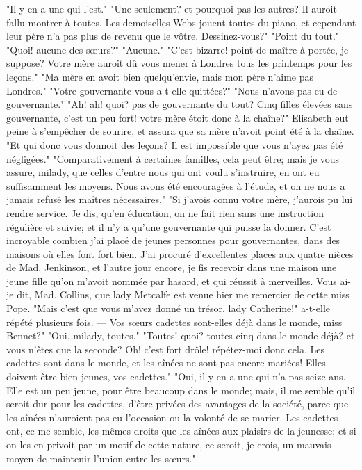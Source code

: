 "Il y en a une qui l'est."
"Une seulement? et pourquoi pas les autres? Il auroit fallu montrer à toutes. Les demoiselles Webs jouent toutes du piano, et cependant leur père n'a pas plus de revenu que le vôtre. Dessinez-vous?"
"Point du tout."
"Quoi! aucune des sœurs?"
"Aucune."
"C'est bizarre! point de maître à portée, je suppose? Votre mère auroit dû vous mener à Londres tous les printemps pour les leçons."
"Ma mère en avoit bien quelqu'envie, mais mon père n'aime pas Londres."
"Votre gouvernante vous a-t-elle quittées?"
"Nous n'avons pas eu de gouvernante."
"Ah! ah! quoi? pas de gouvernante du tout? Cinq filles élevées sans gouvernante, c'est un peu fort! votre mère étoit donc à la chaîne?"
Elisabeth eut peine à s'empêcher de sourire, et assura que sa mère n'avoit point été à la chaîne.
"Et qui donc vous donnoit des leçons? Il est impossible que vous n'ayez pas été négligées."
\setcounter{page}{536}
"Comparativement à certaines familles, cela peut être; mais je vous assure, milady, que celles d'entre nous qui ont voulu s'instruire, en ont eu suffisamment les moyens. Nous avons été encouragées à l'étude, et on ne nous a jamais refusé les maîtres nécessaires."
"Si j'avois connu votre mère, j'aurois pu lui rendre service. Je dis, qu'en éducation, on ne fait rien sans une instruction régulière et suivie; et il n'y a qu'une gouvernante qui puisse la donner. C'est incroyable combien j'ai placé de jeunes personnes pour gouvernantes, dans des maisons où elles font fort bien. J'ai procuré d'excellentes places aux quatre nièces de Mad. Jenkinson, et l'autre jour encore, je fis recevoir dans une maison une jeune fille qu'on m'avoit nommée par hasard, et qui réussit à merveilles. Vous ai-je dit, Mad. Collins, que lady Metcalfe est venue hier me remercier de cette miss Pope. "Mais c'est que vous m'avez donné un trésor, lady Catherine!" a-t-elle répété plusieurs fois. — Vos sœurs cadettes sont-elles déjà dans le monde, miss Bennet?"
"Oui, milady, toutes."
"Toutes! quoi? toutes cinq dans le monde déjà? et vous n'êtes que la seconde? Oh! c'est fort drôle! répétez-moi donc cela. Les\setcounter{page}{537} cadettes sont dans le monde, et les aînées ne sont pas encore mariées! Elles doivent être bien jeunes, vos cadettes."
"Oui, il y en a une qui n'a pas seize ans. Elle est un peu jeune, pour être beaucoup dans le monde; mais, il me semble qu'il seroit dur pour les cadettes, d'être privées des avantages de la société, parce que les aînées n'auroient pas eu l'occasion ou la volonté de se marier. Les cadettes ont, ce me semble, les mêmes droits que les aînées aux plaisirs de la jeunesse; et si on les en privoit par un motif de cette nature, ce seroit, je crois, un mauvais moyen de maintenir l'union entre les sœurs."
